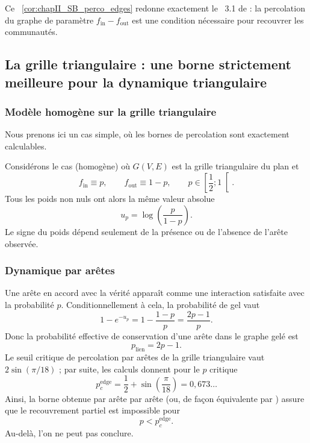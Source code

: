 Ce \Cor~\ref{cor:chapII_SB_perco_edges} redonne exactement le \Th~3.1 de \SB{} \cite{SankararamanBaccelli2018} : la percolation du graphe de paramètre $f_{\mathrm{in}}-f_{\mathrm{out}}$ est une condition nécessaire pour recouvrer les communautés.

\subsection{La grille triangulaire : une borne strictement meilleure pour la dynamique triangulaire}
\label{sec:chapII_triangular_grid}

\subsubsection{Modèle homogène sur la grille triangulaire}

Nous prenons ici un cas simple, où les bornes de percolation sont exactement calculables.

Considérons le cas (homogène) où $G(V,E)$ est la grille triangulaire du plan et
\[
    f_{\mathrm{in}}\equiv p,
    \qquad
    f_{\mathrm{out}}\equiv 1-p,
    \qquad
    p\in\left[\frac12 ; 1\right[.
\]
Tous les poids non nuls ont alors la même valeur absolue
\begin{equation}
    u_p=\log\left(\frac{p}{1-p}\right).
    \label{eq:chapII_up}
\end{equation}
Le signe du poids dépend seulement de la présence ou de l'absence de l'arête observée.

\subsubsection{Dynamique par arêtes}

Une arête en accord avec la vérité apparaît comme une interaction satisfaite avec la probabilité $p$. Conditionnellement à cela, la probabilité de gel vaut
\[
    1-e^{-u_p}=1-\frac{1-p}{p}=\frac{2p-1}{p}.
\]
Donc la probabilité effective de conservation d'une arête dans le graphe gelé est
\begin{equation}
    p_{\mathrm{lien}}=2p-1.
    \label{eq:chapII_plien_edges}
\end{equation}
Le seuil critique de percolation par arêtes de la grille triangulaire vaut $2\sin(\pi/18)$ \cite{Grimmett1999,Grimmett2006} ; par suite, les calculs donnent pour le $p$ critique
\begin{equation}
    p_c^{\mathrm{edge}}
    =
    \frac12+\sin\left(\frac\pi{18}\right)
    =0,673\ldots
    \label{eq:chapII_pc_edges}
\end{equation}
Ainsi, la borne obtenue par \SW{} arête par arête (ou, de façon équivalente par \SB{}) assure que le recouvrement partiel est impossible pour
\[
    p<p_c^{\mathrm{edge}}.
\]
Au-delà, l'on ne peut pas conclure.

